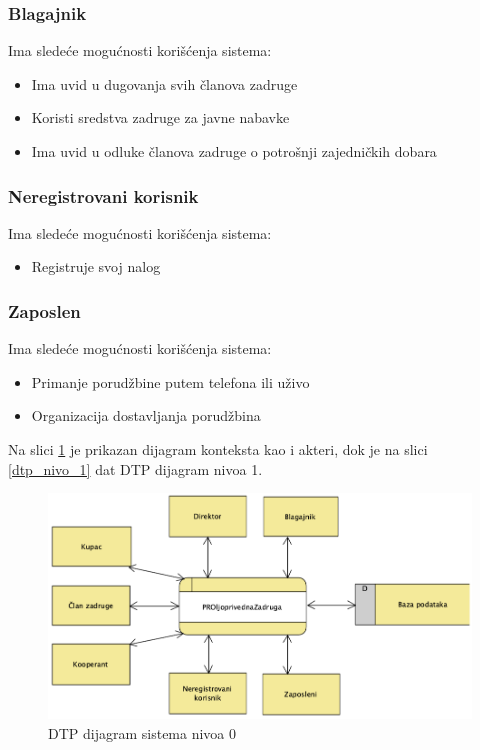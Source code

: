 \documentclass[a4paper]{article}
\begin{document}
\subsubsection{Blagajnik}
\indent Ima sledeće mogućnosti korišćenja sistema:
\begin{itemize}
    \item Ima uvid u dugovanja svih članova zadruge
    \item Koristi sredstva zadruge za javne nabavke
    \item Ima uvid u odluke članova zadruge o potrošnji zajedničkih dobara
\end{itemize}

\subsubsection{Neregistrovani korisnik}
\indent Ima sledeće mogućnosti korišćenja sistema:
\begin{itemize}
    \item Registruje svoj nalog
\end{itemize}

\subsubsection{Zaposlen}
\indent Ima sledeće mogućnosti korišćenja sistema:
\begin{itemize}
    \item Primanje porudžbine putem telefona ili uživo
    \item Organizacija dostavljanja porudžbina
\end{itemize}

\newpage

Na slici \ref{dtp_nivo_0} je prikazan dijagram konteksta kao i akteri, dok je na slici \ref{dtp_nivo_1} dat DTP dijagram nivoa 1.
\begin{figure}[h!]
    \centering
    \includegraphics[scale=0.72]{images/dtp_nivo_0.png}
    \caption{DTP dijagram sistema nivoa 0}
    \label{dtp_nivo_0}
\end{figure}
\end{document}
